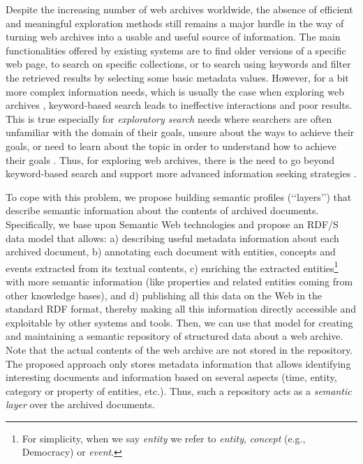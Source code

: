 \documentclass{libtex/sig-alternate-05-2015}
\newcommand{\q}[1]{\lq\lq{}{}#1\rq\rq{}{}}
\begin{document}
Despite the increasing number of web archives worldwide,
the absence of efficient and meaningful exploration methods
still remains a major hurdle in the
way of turning web archives into a usable and useful source of information.
The main functionalities offered by existing systems are to find
older versions of a specific web page,
to search on specific collections,
or to search using keywords
and filter the retrieved results by
selecting some basic metadata values.
However,
for a bit more complex information needs,
which is usually the case when exploring web archives \cite{whitelaw2012towards},
keyword-based search
leads to ineffective interactions and poor results\cite{johnson2008users}.
This is true especially for {\em exploratory search} needs
where searchers
are often unfamiliar with the domain of their goals,
unsure about the ways to achieve their goals,
or need to learn about the topic in order to understand how to
achieve their goals \cite{marchionini2006exploratory}.
Thus, for exploring web archives,
there is the need to go beyond keyword-based search and
support more advanced information seeking
strategies \cite{johnson2008users,whitelaw2012towards,whitelaw2015generous}.

To cope with this problem,
we propose building semantic profiles (\q{layers}) that describe semantic information about
the contents of archived documents.
Specifically, we base upon Semantic Web technologies and
propose an RDF/S \cite{brickley2014rdf} data model that allows:
a) describing useful metadata information about each archived document,
b) annotating each document with entities, concepts and events
extracted from its textual contents,
c) enriching the extracted entities\footnote{For simplicity,
when we say {\em entity} we refer to {\em entity}, {\em concept} (e.g., Democracy) or {\em event}.}
with more semantic information (like properties and related entities coming from
other knowledge bases), and
d) publishing all this data on the Web in the standard RDF format,
thereby making all this information directly accessible and exploitable by other systems and tools.
Then, we can use that model for creating and maintaining a semantic repository
of structured data about a web archive.
Note that the actual contents of the web archive are not
stored in the repository.
The proposed approach only stores metadata information
that allows identifying interesting documents and information based on
several aspects (time, entity, category or property of entities, etc.).
Thus, such a repository acts as a {\em semantic layer} over the archived documents.
\end{document}
